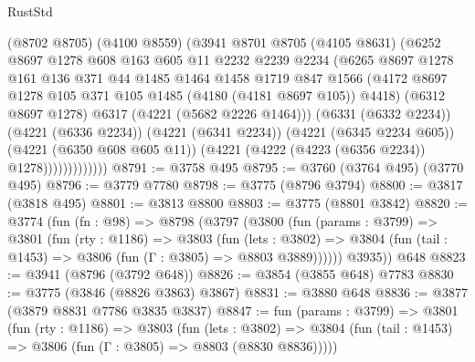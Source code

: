 \begin{lexlean}{RustStd}
\begin{coremodule}
{\begin{coremodule}
{{{{{{{{{{{{{{{{{{{{{{{{{{{{{{{                      (@8702 @8705)
                      (@4100 @8559)
                      (@3941
                        @8701
                        @8705
                        (@4105 @8631)
                        (@6252
                          @8697
                          @1278
                          @608
                          @163
                          @605
                          @11
                          @2232
                          @2239
                          @2234
                          (@6265
                            @8697
                            @1278
                            @161
                            @136
                            @371
                            @44
                            @1485
                            @1464
                            @1458
                            @1719
                            @847
                            @1566
                            (@4172
                              @8697
                              @1278
                              @105
                              @371
                              @105
                              @1485
                              (@4180 (@4181 @8697 @105))
                              @4418)
                            (@6312 @8697 @1278)
                            @6317
                            (@4221 (@5682 @2226 @1464)))
                          (@6331 (@6332 @2234))
                          (@4221 (@6336 @2234))
                          (@4221 (@6341 @2234))
                          (@4221 (@6345 @2234 @605))
                          (@4221 (@6350 @608 @605 @11))
                          (@4221 (@4222 (@4223 (@6356 @2234)) @1278)))))))))))))
@8791 := @3758 @495
@8795 := @3760 (@3764 @495) (@3770 @495)
@8796 := @3779 @7780
@8798 := @3775 (@8796 @3794)
@8800 := @3817 (@3818 @495)
@8801 := @3813 @8800
@8803 := @3775 (@8801 @3842)
@8820 := @3774
    (fun (fn : @98) =>
    @8798
      (@3797
        (@3800
          (fun (params : @3799) =>
          @3801
            (fun (rty : @1186) =>
            @3803
              (fun (lets : @3802) =>
              @3804 (fun (tail : @1453) => @3806 (fun (Γ : @3805) => @8803 @3889))))))
        @3935))
    @648
@8823 := @3941 (@8796 (@3792 @648))
@8826 := @3854 (@3855 @648) @7783
@8830 := @3775 (@3846 (@8826 @3863) @3867)
@8831 := @3880 @648
@8836 := @3877 (@3879 @8831 @7786 @3835 @3837)
@8847 := fun (params : @3799) =>
  @3801
    (fun (rty : @1186) =>
    @3803
      (fun (lets : @3802) =>
      @3804 (fun (tail : @1453) => @3806 (fun (Γ : @3805) => @8803 (@8830 @8836)))))
}}}}}}}}}}}}}}}}}}}}}}}}}}}}}}}
\end{coremodule}}
\end{coremodule}
\end{lexlean}
